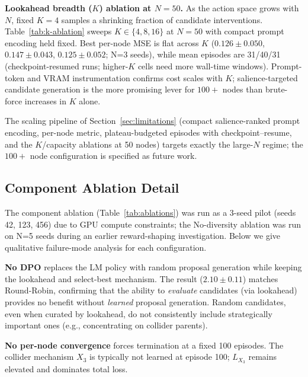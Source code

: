 \documentclass[twoside]{article}
\theoremstyle{plain}
\theoremstyle{definition}
\theoremstyle{remark}
\begin{document}
\textbf{Lookahead breadth ($K$) ablation at $N{=}50$.} As the action space grows with $N$, fixed $K{=}4$ samples a shrinking fraction of candidate interventions. Table~\ref{tab:k-ablation} sweeps $K\in\{4,8,16\}$ at $N{=}50$ with compact prompt encoding held fixed. Best per-node MSE is flat across $K$ ($0.126\pm0.050$, $0.147\pm0.043$, $0.125\pm0.052$; N=3 seeds), while mean episodes are 31/40/31 (checkpoint-resumed runs; higher-$K$ cells need more wall-time windows). Prompt-token and VRAM instrumentation confirms cost scales with $K$; salience-targeted candidate generation is the more promising lever for $100+$ nodes than brute-force increases in $K$ alone.


The scaling pipeline of Section~\ref{sec:limitations} (compact salience-ranked prompt encoding, per-node metric, plateau-budgeted episodes with checkpoint--resume, and the $K$/capacity ablations at 50 nodes) targets exactly the large-$N$ regime; the $100+$ node configuration is specified as future work.

\subsection{Component Ablation Detail}
\label{app:ablation-detail}

The component ablation (Table~\ref{tab:ablations}) was run as a 3-seed pilot (seeds 42, 123, 456) due to GPU compute constraints; the No-diversity ablation was run on N=5 seeds during an earlier reward-shaping investigation. Below we give qualitative failure-mode analysis for each configuration.

\textbf{No DPO} replaces the LM policy with random proposal generation while keeping the lookahead and select-best mechanism. The result ($2.10\pm0.11$) matches Round-Robin, confirming that the ability to \emph{evaluate} candidates (via lookahead) provides no benefit without \emph{learned} proposal generation. Random candidates, even when curated by lookahead, do not consistently include strategically important ones (e.g., concentrating on collider parents).

\textbf{No per-node convergence} forces termination at a fixed 100 episodes. The collider mechanism $X_3$ is typically not learned at episode 100; $L_{X_3}$ remains elevated and dominates total loss.
\end{document}
